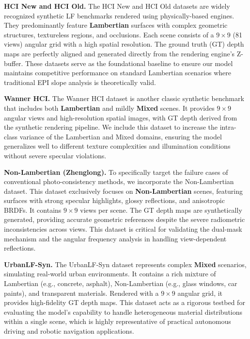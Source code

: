 \documentclass[journal]{IEEEtran}
\begin{document}
\textbf{HCI New and HCI Old.} The HCI New and HCI Old datasets are widely recognized synthetic LF benchmarks rendered using physically-based engines. They predominantly feature \textbf{Lambertian} surfaces with complex geometric structures, textureless regions, and occlusions. Each scene consists of a $9 \times 9$ (81 views) angular grid with a high spatial resolution. The ground truth (GT) depth maps are perfectly aligned and generated directly from the rendering engine's Z-buffer. These datasets serve as the foundational baseline to ensure our model maintains competitive performance on standard Lambertian scenarios where traditional EPI slope analysis is theoretically valid.

\textbf{Wanner HCI.} The Wanner HCI dataset is another classic synthetic benchmark that includes both \textbf{Lambertian} and mildly \textbf{Mixed} scenes. It provides $9 \times 9$ angular views and high-resolution spatial images, with GT depth derived from the synthetic rendering pipeline. We include this dataset to increase the intra-class variance of the Lambertian and Mixed domains, ensuring the model generalizes well to different texture complexities and illumination conditions without severe specular violations.

\textbf{Non-Lambertian (Zhenglong).} To specifically target the failure cases of conventional photo-consistency methods, we incorporate the Non-Lambertian dataset. This dataset exclusively focuses on \textbf{Non-Lambertian} scenes, featuring surfaces with strong specular highlights, glossy reflections, and anisotropic BRDFs. It contains $9 \times 9$ views per scene. The GT depth maps are synthetically generated, providing accurate geometric references despite the severe radiometric inconsistencies across views. This dataset is critical for validating the dual-mask mechanism and the angular frequency analysis in handling view-dependent reflections.

\textbf{UrbanLF-Syn.} The UrbanLF-Syn dataset represents complex \textbf{Mixed} scenarios, simulating real-world urban environments. It contains a rich mixture of Lambertian (e.g., concrete, asphalt), Non-Lambertian (e.g., glass windows, car paints), and transparent materials. Rendered with a $9 \times 9$ angular grid, it provides high-fidelity GT depth maps. This dataset acts as a rigorous testbed for evaluating the model's capability to handle heterogeneous material distributions within a single scene, which is highly representative of practical autonomous driving and robotic navigation applications.
\end{document}
